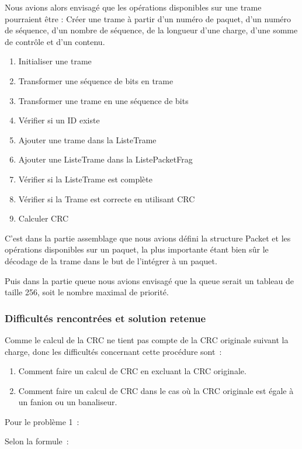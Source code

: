 \documentclass[a4paper,11pt]{article}
\begin{document}
Nous avions alors envisagé que les opérations disponibles sur une trame pourraient être :
Créer une trame à partir d'un numéro de paquet, d'un numéro de séquence, d'un nombre de séquence, de la longueur d'une charge, d'une somme de contrôle et d'un contenu.
\begin{enumerate}
 \item Initialiser une trame
 \item Transformer une séquence de bits en trame
 \item Transformer une trame en une séquence de bits
 \item Vérifier si un ID existe
 \item Ajouter une trame dans la ListeTrame
 \item Ajouter une ListeTrame dans la ListePacketFrag
 \item Vérifier si la ListeTrame est complète
 \item Vérifier si la Trame est correcte en utilisant CRC
 \item Calculer CRC
\end{enumerate}

C'est dans la partie assemblage que nous avions défini la structure Packet et les opérations disponibles sur un paquet, la plus importante étant bien sûr le décodage de la trame dans le but de l'intégrer à un paquet.

Puis dans la partie queue nous avions envisagé que la queue serait un tableau de taille 256, soit le nombre maximal de priorité. 

\subsubsection{Difficultés rencontrées et solution retenue}

Comme le calcul de la CRC ne tient pas compte de la CRC originale suivant la charge, donc les difficultés concernant cette procédure sont :
\begin{enumerate}
 \item Comment faire un calcul de CRC en excluant la CRC originale.
 \item Comment faire un calcul de CRC dans le cas où la CRC originale est égale à un fanion ou un banaliseur.
\end{enumerate}


\vspace{0.5cm}

Pour le problème 1 :

Selon la formule :
\end{document}
